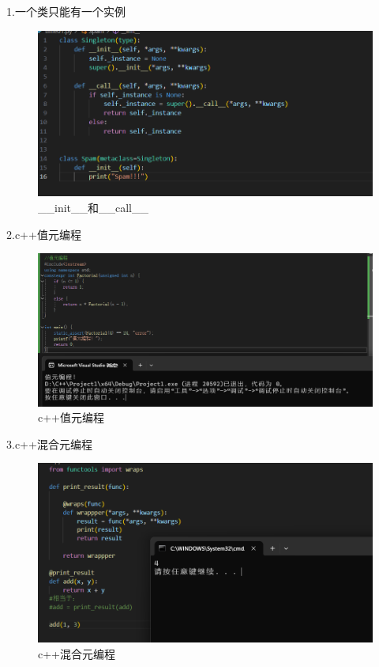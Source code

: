 \documentclass[a4paper, 12pt]{article}
\begin{document}
1.一个类只能有一个实例
\begin{figure}[H]
  \centering
  \includegraphics[width=\textwidth]{屏幕截图 2024-09-15 183935.png}
  \caption{ \_\_init\_\_和\_\_call\_\_}
\end{figure}

2.c++值元编程
\begin{figure}[H]
  \centering
  \includegraphics[width=\textwidth]{屏幕截图 2024-09-15 184403.png}
  \caption{ c++值元编程}
\end{figure}


3.c++混合元编程
\begin{figure}[H]
  \centering
  \includegraphics[width=\textwidth]{屏幕截图 2024-09-15 185638.png}
  \caption{ c++混合元编程}
\end{figure}
\end{document}
